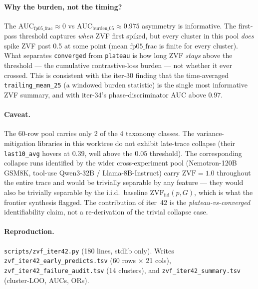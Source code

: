 \paragraph{Why the burden, not the timing?}
The $\mathrm{AUC}_{\mathrm{fp05\_frac}} \approx 0$ vs
$\mathrm{AUC}_{\mathrm{burden\_05}} \approx 0.975$ asymmetry is
informative. The first-pass threshold captures \emph{when} ZVF first
spiked, but every cluster in this pool \emph{does} spike ZVF past
0.5 at some point (mean $\mathrm{fp05\_frac}$ is finite for every
cluster). What separates \texttt{converged} from \texttt{plateau} is
how long ZVF \emph{stays} above the threshold --- the cumulative
contrastive-loss burden --- not whether it ever crossed. This is
consistent with the iter-30 finding that the time-averaged
\texttt{trailing\_mean\_25} (a windowed burden statistic) is the
single most informative ZVF summary, and with iter-34's
phase-discriminator AUC above $0.97$.

\paragraph{Caveat.}
The 60-row pool carries only 2 of the 4 taxonomy classes. The
variance-mitigation libraries in this worktree do not exhibit
late-trace collapse (their \texttt{last10\_avg} hovers at $0.39$,
well above the $0.05$ threshold). The corresponding collapse runs
identified by the wider cross-experiment pool (Nemotron-120B GSM8K,
tool-use Qwen3-32B / Llama-8B-Instruct) carry $\mathrm{ZVF}{=}1.0$
throughout the entire trace and would be trivially separable by any
feature --- they would also be trivially separable by the i.i.d.\
baseline $\mathrm{ZVF}_{\mathrm{iid}}(p,G)$, which is what the
frontier synthesis flagged. The contribution of iter~42 is the
\emph{plateau-vs-converged} identifiability claim, not a re-derivation
of the trivial collapse case.

\paragraph{Reproduction.}
\texttt{scripts/zvf_iter42.py} (180 lines, stdlib only). Writes
\texttt{zvf_iter42_early_predicts.tsv} (60 rows $\times$ 21 cols),
\texttt{zvf_iter42_failure_audit.tsv} (14 clusters), and
\texttt{zvf_iter42_summary.tsv} (cluster-LOO, AUCs, ORs).
